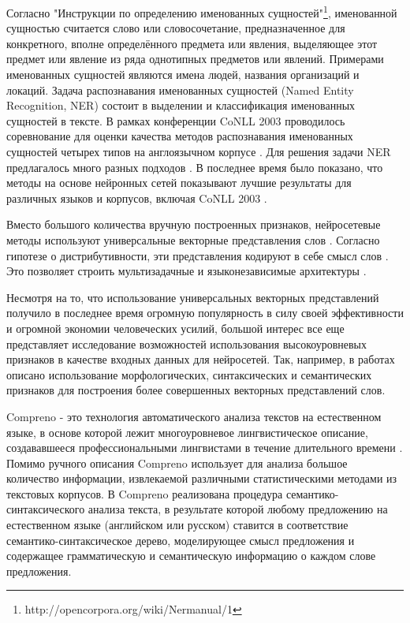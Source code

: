 \Introduction

  Согласно "Инструкции по определению именованных сущностей"\footnote{http://opencorpora.org/wiki/Nermanual/1},
  именованной сущностью считается слово или словосочетание, предназначенное для
  конкретного, вполне определённого предмета или явления,
  выделяющее этот предмет или явление из ряда однотипных предметов или явлений.
  Примерами именованных сущностей являются имена людей, названия организаций и локаций.
  Задача распознавания именованных сущностей (Named Entity Recognition, NER)
  состоит в выделении и классификация именованных сущностей в тексте.
  В рамках конференции CoNLL 2003 проводилось соревнование
  для оценки качества методов распознавания именованных сущностей четырех типов
  на англоязычном корпусе \citep{tjong2003introduction}.
  Для решения задачи NER предлагалось много разных подходов \citep{nadeau2007survey}.
  В последнее время было показано, что методы на основе нейронных сетей показывают
  лучшие результаты для различных языков и корпусов, включая CoNLL 2003 \citep{DBLP:journals/corr/YangSC16}.

  Вместо большого количества вручную построенных признаков,
  нейросетевые методы используют универсальные
  векторные представления слов \citep{mikolov2013distributed}.
  Согласно гипотезе о дистрибутивности, эти представления
  кодируют в себе смысл слов \citep{sahlgren2008distributional}.
  Это позволяет строить мультизадачные и языконезависимые
  архитектуры \citep{collobert2011natural, DBLP:journals/corr/YangSC16}.

  Несмотря на то, что использование универсальных векторных представлений
  получило в последнее время огромную популярность в силу своей эффективности
  и огромной экономии человеческих усилий, большой интерес все еще представляет
  исследование возможностей использования высокоуровневых признаков
  в качестве входных данных для нейросетей.
  Так, например, в работах \citep{xu2014rc, bian2014knowledge} описано использование
  морфологических, синтаксических и семантических признаков для построения
  более совершенных векторных представлений слов.

  Compreno -  это технология автоматического анализа текстов на естественном языке,
  в основе которой
  лежит многоуровневое лингвистическое описание, создававшееся профессиональными
  лингвистами в течение длительного времени \citep{anisimovich2012syntactic}.
  Помимо ручного описания Compreno использует для анализа большое количество
  информации, извлекаемой различными статистическими методами из текстовых корпусов.
  В Compreno реализована процедура семантико-синтаксического анализа текста,
  в результате которой любому предложению на естественном языке (английском или русском)
  ставится в соответствие семантико-синтаксическое дерево, моделирующее смысл предложения
  и содержащее грамматическую и семантическую информацию о каждом слове предложения.

